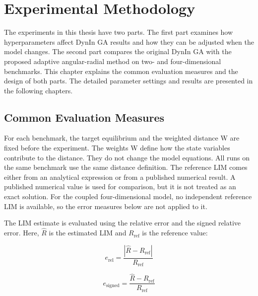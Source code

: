 \chapter{Experimental Methodology}

\label{ch:methodology}

\begin{revision}
The experiments in this thesis have two parts. The first part examines how hyperparameters affect DynIn GA results and how they can be adjusted when the model changes. The second part compares the original DynIn GA with the proposed adaptive angular-radial method on two- and four-dimensional benchmarks. This chapter explains the common evaluation measures and the design of both parts. The detailed parameter settings and results are presented in the following chapters.
\end{revision}

\section{Common Evaluation Measures}

For each benchmark, the target equilibrium and the weighted distance W are fixed before the experiment. The weights W define how the state variables contribute to the distance. They do not change the model equations. All runs on the same benchmark use the same distance definition. The reference LIM comes either from an analytical expression or from a published numerical result. A published numerical value is used for comparison, but it is not treated as an exact solution. For the coupled four-dimensional model, no independent reference LIM is available, so the error measures below are not applied to it.

\begin{revision}
The LIM estimate is evaluated using the relative error and the signed relative error. Here, $\hat{R}$ is the estimated LIM and ${R}_{\mathrm{ref}}$ is the reference value:
\end{revision}

\begin{equation}
  {e}_{\mathrm{rel}} = \frac{|\hat{R} - {R}_{\mathrm{ref}}|}{{R}_{\mathrm{ref}}}
\end{equation}

\begin{equation}
  {e}_{\mathrm{signed}} = \frac{\hat{R} - {R}_{\mathrm{ref}}}{{R}_{\mathrm{ref}}}
\end{equation}

